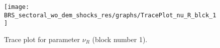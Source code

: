 \begin{figure}[H]
\centering
  \texttt{[image: BRS\_sectoral\_wo\_dem\_shocks\_res/graphs/TracePlot\_nu\_R\_blck\_1]}\\
    \caption{Trace plot for parameter ${\nu_R}$ (block number 1).}
\end{figure}
